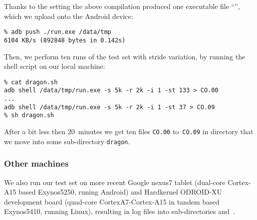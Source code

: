 Thanks to the setting  the above compilation produced one
executable file ``'', which we upload onto the Android device:
\begin{verbatim}
% adb push ./run.exe /data/tmp
6104 KB/s (892848 bytes in 0.142s)
\end{verbatim}
Then, we perform ten runs of the test set with stride variation,
by running the shell script  on our local machine:
\begin{verbatim}
% cat dragon.sh
adb shell /data/tmp/run.exe -s 5k -r 2k -i 1 -st 133 > CO.00
...
adb shell /data/tmp/run.exe -s 5k -r 2k -i 1 -st 37 > CO.09
% sh dragon.sh
\end{verbatim}
After a bit less then $20$~minutes we get ten files
\texttt{CO.00} to~\texttt{CO.09} in directory 
that we move into some sub-directory \texttt{dragon}.

\subsubsection{Other machines}
We also run our test set on more recent
Google nexus7 tablet (dual-core Cortex-A15 based Exynos5250, runing Android)
and Hardkernel ODROID-XU development board
(quad-core CortexA7-Cortex-A15 in tandem based Exynos5410, running Linux),
resulting in log files into sub-directories  and~.

\fi
